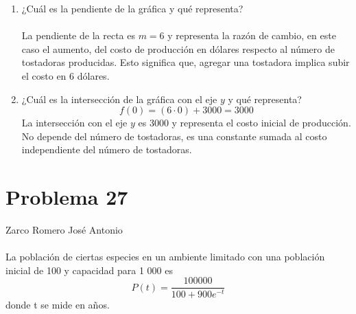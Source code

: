 \documentclass[12pt]{article}
\begin{document}
\begin{enumerate}
\item  ¿Cuál es la pendiente de la gráfica y qué representa?
\\ \\
La pendiente de la recta es $m=6$ y representa la razón de cambio, en este caso el aumento, del costo de producción en dólares respecto al número de tostadoras producidas. Esto significa que, agregar una tostadora implica subir el costo en 6 dólares.\\ 
 
\item  ¿Cuál es la intersección de la gráfica con el eje $y$ y qué representa?
\\
\[
f(0) = (6 \cdot 0) + 3000 = 3000
\]
La intersección con el eje $y$ es 3000 y representa el costo inicial de producción. No depende del número de tostadoras, es una constante sumada al costo independiente del número de tostadoras.
\\
\end{enumerate}

\section{Problema 27}
Zarco Romero José Antonio\\
\\
La población de ciertas especies en un ambiente limitado con una población inicial de 100 y capacidad para 1 000 es 
\[
P (t) = \frac{100 000}{100 + 900 e^{-t}} 
\]
donde t se mide en años.
\end{document}
